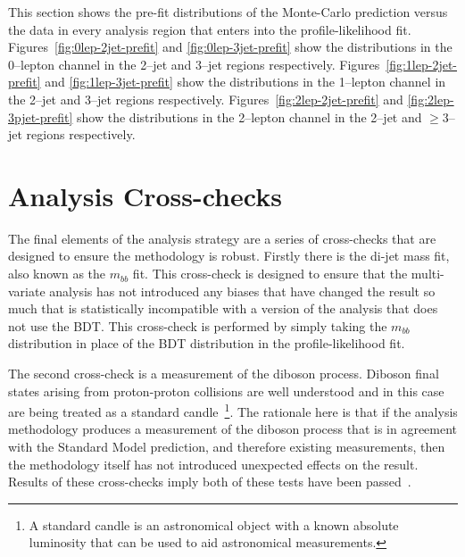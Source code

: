 This section shows the pre-fit distributions of the Monte-Carlo prediction
versus the data in every analysis region that enters into the profile-likelihood
fit. Figures~\ref{fig:0lep-2jet-prefit} and \ref{fig:0lep-3jet-prefit} show the
distributions in the 0--lepton channel in the 2--jet and 3--jet regions
respectively. Figures~\ref{fig:1lep-2jet-prefit} and \ref{fig:1lep-3jet-prefit}
show the distributions in the 1--lepton channel in the 2--jet and 3--jet regions
respectively. Figures~\ref{fig:2lep-2jet-prefit} and \ref{fig:2lep-3pjet-prefit}
show the distributions in the 2--lepton channel in the 2--jet and $\geq$3--jet
regions respectively.






\clearpage
\newpage

\section{Analysis Cross-checks}

The final elements of the analysis strategy are a series of cross-checks that
are designed to ensure the methodology is robust. Firstly there is the di-jet
mass fit, also known as the $m_{bb}$ fit. This cross-check is designed to ensure
that the multi-variate analysis has not introduced any biases that have changed
the result so much that is statistically incompatible with a version of the
analysis that does not use the BDT. This cross-check is performed by simply
taking the $m_{bb}$ distribution in place of the BDT distribution in the
profile-likelihood fit.

The second cross-check is a measurement of the diboson process. Diboson final
states arising from proton-proton collisions are well understood and in this
case are being treated as a standard candle~\footnote{A standard candle is an
  astronomical object with a known absolute luminosity that can be used to aid
  astronomical measurements. }. The rationale here is that if the analysis
methodology produces a measurement of the diboson process that is in agreement
with the Standard Model prediction, and therefore existing measurements, then
the methodology itself has not introduced unexpected effects on the result.
Results of these cross-checks imply both of these tests have been
passed~\cite{VHMainNote2019}.

